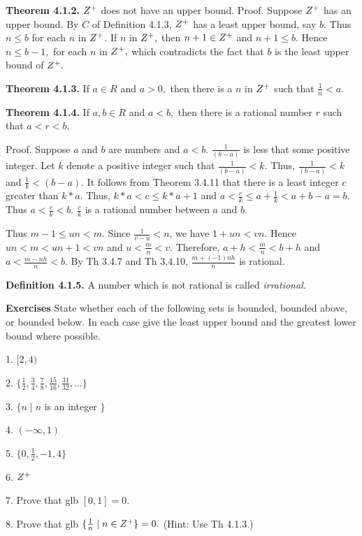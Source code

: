 \textbf{Theorem 4.1.2.} $Z^{+}$  does not have an upper bound.\nl
 Proof. Suppose $Z^{+}$ has an upper bound. By $C$ of Definition 4.1.3, $Z^{+}$ has a least upper bound, say $b.$ Thus $n\leq b$ for each
$n$ in $Z^{+}$. If $n$ in $Z^{+},$ then $n+1\in Z^{+}$ and $n+1 \leq b.$ Hence $n \leq  b-1,$ for each $n$ in $Z^{+},$ which contradicts the fact that $b$ is the least upper bound of $Z^{+}.$ \nl


\textbf{Theorem 4.1.3.} If $a\in R$ and $a > 0,$ then there is a $n$ in $Z^{+}$ such that $\frac{1}{n} < a.$\nl

\textbf{Theorem 4.1.4.} If $a,b\in R$ and $a < b,$ then there is a rational number $r$ such that $a < r < b.$\nl

Proof. Suppose $a$ and $b$ are numbers and $a < b.$  $\frac{1}{(b - a)}$ is less that some positive integer.
Let $k$ denote a positive integer such that $\frac{1}{(b - a)} < k.$  Thus, $\frac{1}{(b - a)} < k$ and $\frac{1}{k} < (b - a).$  It follows from Theorem 3.4.11 that there is a least integer $c$ greater than $k*a.$  Thus, $k*a < c \leq k*a + 1$ and $a < \frac{c}{k} \leq a + \frac{1}{k} < a + b - a = b.$  Thus $a < \frac{c}{k}
< b.$  $\frac{c}{k} $ is a rational number between $a$ and $b.$\nl

\newpage


Thus $m - 1 \leq un < m.$ Since $\frac{1}{v - u} < n$, we have $1 + un < vn.$ Hence $un < m < un + 1 < vn$ and
$u < \frac{m}{n} < v.$  Therefore, $a + h <\frac{m}{n} < b + h$ and $a < \frac{m - nh}{n} < b.$ By Th 3.4.7 and Th 3.4.10, $\frac{m +(-1)nh}{n} $ is rational.\nl

\textbf{Definition 4.1.5.} A number which is not rational is called \textit{irrational.}\nl

\textbf{Exercises }
State whether each of the following sets is bounded, bounded above, or bounded below.
In each case give the least upper bound and the greatest lower bound where possible.\nl

1. $[2,4)$\nl

2. $\{\frac{1}{2}, \frac{3}{4},\frac{7}{8},\frac{15}{16},\frac{31}{32},\dots \}$\nl

3. $\{n \mid n$ is an integer $\} $\nl

4. $(-\infty,1)$\nl

5. $\{0, \frac{1}{2}, -1,4 \}$ \nl

6. $Z^{+}$\nl

7. Prove that glb $[0,1]=0.$ \nl

8. Prove that glb $\{ \frac{1}{n} \mid n\in Z^{+}\} = 0.$ (Hint: Use Th 4.1.3.)\nl

